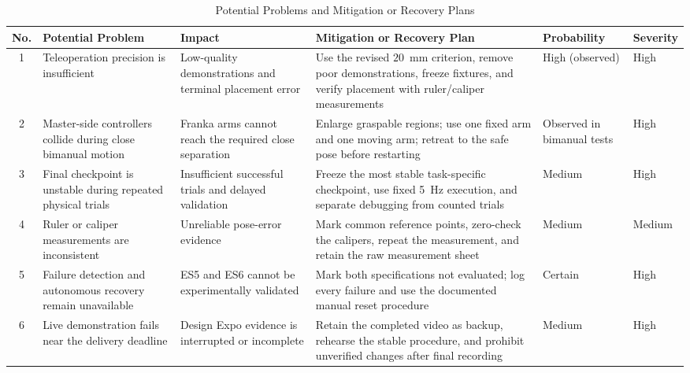 \documentclass[12pt, letterpaper]{article}
\begin{document}
\begin{table}[H]
\centering
\caption{Potential Problems and Mitigation or Recovery Plans}
\label{tab:risk-analysis}
\scriptsize
\setlength{\tabcolsep}{2.2pt}
\renewcommand{\arraystretch}{1.02}
\begin{tabularx}{\textwidth}{c
>{\raggedright\arraybackslash}p{2.05cm}
>{\raggedright\arraybackslash}p{2.05cm}
>{\raggedright\arraybackslash}X
>{\centering\arraybackslash}p{1.75cm}
>{\centering\arraybackslash}p{1.35cm}}
\toprule
\textbf{No.} & \textbf{Potential Problem} & \textbf{Impact} &
\textbf{Mitigation or Recovery Plan} & \textbf{Probability} &
\textbf{Severity} \\
\midrule
1 & Teleoperation precision is insufficient & Low-quality demonstrations and
terminal placement error & Use the revised $20$~mm criterion, remove poor
demonstrations, freeze fixtures, and verify placement with ruler/caliper
measurements & High (observed) & High \\
2 & Master-side controllers collide during close bimanual motion & Franka arms
cannot reach the required close separation & Enlarge graspable regions; use one
fixed arm and one moving arm; retreat to the safe pose before restarting &
Observed in bimanual tests & High \\
3 & Final checkpoint is unstable during repeated physical trials & Insufficient
successful trials and delayed validation & Freeze the most stable task-specific
checkpoint, use fixed 5~Hz execution, and separate debugging from counted trials
& Medium & High \\
4 & Ruler or caliper measurements are inconsistent & Unreliable pose-error
evidence & Mark common reference points, zero-check the calipers, repeat the
measurement, and retain the raw measurement sheet & Medium & Medium \\
5 & Failure detection and autonomous recovery remain unavailable & ES5 and ES6
cannot be experimentally validated & Mark both specifications not evaluated;
log every failure and use the documented manual reset procedure & Certain &
High \\
6 & Live demonstration fails near the delivery deadline & Design Expo evidence
is interrupted or incomplete & Retain the completed video as backup, rehearse
the stable procedure, and prohibit unverified changes after final recording &
Medium & High \\
\bottomrule
\end{tabularx}
\end{table}
\end{document}
